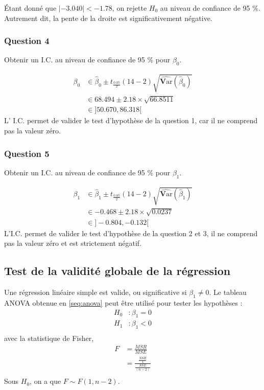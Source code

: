 \documentclass[11pt,french]{report}
\newcommand{\Var}{\mathrm{\textbf{V}ar}}
\begin{document}
Étant donné que $|-3.040| < -1.78$, on rejette $H_0$ au niveau de confiance de 95 \%. Autrement dit, la pente de la droite est significativement négative.

\subsubsection*{Question 4}
Obtenir un I.C. au niveau de confiance de 95 \% pour $\beta_0$.

\begin{align*}
\beta_0 &\in \hat{\beta}_0 \pm t_{\frac{0.05}{2}}(14-2)\sqrt{\widehat{\Var}(\hat{\beta}_0)} \\
& \in 68.494 \pm 2.18 \times \sqrt{66.8511} \\
&\in \big] 50.670, 86.318 \big[
\end{align*}
L' I.C. permet de valider le test d'hypothèse de la question 1, car il ne comprend pas la valeur zéro.

\subsubsection*{Question 5}
Obtenir un I.C. au niveau de confiance de 95 \% pour $\beta_1$.

\begin{align*}
\beta_1 &\in \hat{\beta}_1 \pm t_{\frac{0.05}{2}}(14-2)\sqrt{\widehat{\Var}(\hat{\beta}_1)} \\
& \in -0.468 \pm 2.18 \times \sqrt{0.0237} \\
&\in \big] -0.804, -0.132 \big[
\end{align*}
L'I.C. permet de valider le test d'hypothèse de la question 2 et 3, il ne comprend pas la valeur zéro et est strictement négatif.

\subsection{Test de la validité globale de la régression}
Une régression linéaire simple est valide, ou significative si $\beta_1 \neq 0$. Le tableau ANOVA obtenue en \ref{seq:anova} peut être utilisé pour tester les hypothèses :
\begin{align*}
H_0 &: \beta_1 = 0\\
H_1 &: \beta_1 < 0 \\
\end{align*}
avec la statistique de Fisher,
\begin{align*}
F &= \frac{MSR}{MSE} \\
&= \frac{\frac{SSR}{1}}{\frac{SSE}{(n-2)}} \\
\end{align*}
Sous $H_0$, on a que $F \sim F(1, n-2)$. \newline
\end{document}
